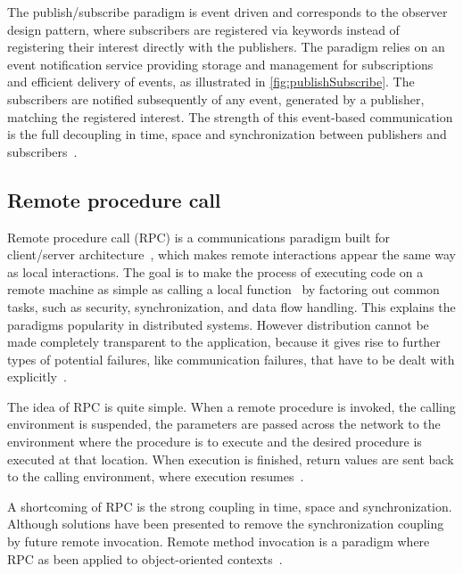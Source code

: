The publish/subscribe paradigm is event driven and corresponds to the observer design pattern, where subscribers are registered via keywords instead of registering their interest directly with the publishers. The paradigm relies on an event notification service providing storage and management for subscriptions and efficient delivery of events, as illustrated in \cref{fig:publishSubscribe}. The subscribers are notified subsequently of any event, generated by a publisher, matching the registered interest. The strength of this event-based communication is the full decoupling in time, space and synchronization between publishers and subscribers~\cite{eugster2003many}.




\subsection{Remote procedure call}
\label{sec:analysis:rpc}
Remote procedure call (RPC) is a communications paradigm built for client/server architecture~\cite{Microsoft2003RPC}, which makes remote interactions appear the same way as local interactions. The goal is to make the process of executing code on a remote machine as simple as calling a local function~\cite{dusseau2014intro} by factoring out common tasks, such as security, synchronization, and data flow handling. This explains the paradigms popularity in distributed systems. However distribution cannot be made completely transparent to the application, because it gives rise to further types of potential failures, like communication failures, that have to be dealt with explicitly~\cite{coulouris2005distributed}. 

The idea of RPC is quite simple. When a remote procedure is invoked, the calling environment is suspended, the parameters are passed across the network to the environment where the procedure is to execute and the desired procedure is executed at that location. When execution is finished, return values are sent back to the calling environment, where execution resumes~\cite{birrell1984implementing}.

A shortcoming of RPC is the strong coupling in time, space and synchronization. Although solutions have been presented to remove the synchronization coupling by future remote invocation. Remote method invocation is a paradigm where RPC as been applied to object-oriented contexts~\cite{eugster2003many}.

